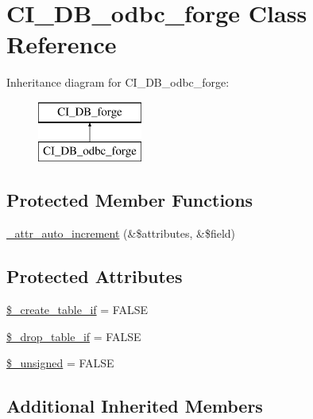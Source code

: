 \hypertarget{class_c_i___d_b__odbc__forge}{}\section{C\+I\+\_\+\+D\+B\+\_\+odbc\+\_\+forge Class Reference}
\label{class_c_i___d_b__odbc__forge}
Inheritance diagram for C\+I\+\_\+\+D\+B\+\_\+odbc\+\_\+forge\+:\begin{figure}[H]
\begin{center}
\leavevmode
\includegraphics[height=2.000000cm]{class_c_i___d_b__odbc__forge}
\end{center}
\end{figure}
\subsection*{Protected Member Functions}
\begin{DoxyCompactItemize}
\item 
\mbox{\hyperlink{class_c_i___d_b__odbc__forge_a2a013a5932439c3c44f0dad3436525f7}{\+\_\+attr\+\_\+auto\+\_\+increment}} (\&\$attributes, \&\$field)
\end{DoxyCompactItemize}
\subsection*{Protected Attributes}
\begin{DoxyCompactItemize}
\item 
\mbox{\hyperlink{class_c_i___d_b__odbc__forge_a2f6484fcb8d1dc3eef67a637227cd583}{\$\+\_\+create\+\_\+table\+\_\+if}} = F\+A\+L\+SE
\item 
\mbox{\hyperlink{class_c_i___d_b__odbc__forge_a92a8a9145a7fc91e252e58d019373581}{\$\+\_\+drop\+\_\+table\+\_\+if}} = F\+A\+L\+SE
\item 
\mbox{\hyperlink{class_c_i___d_b__odbc__forge_aae977ae6d61fa183f0b25422b6ddc31c}{\$\+\_\+unsigned}} = F\+A\+L\+SE
\end{DoxyCompactItemize}
\subsection*{Additional Inherited Members}


